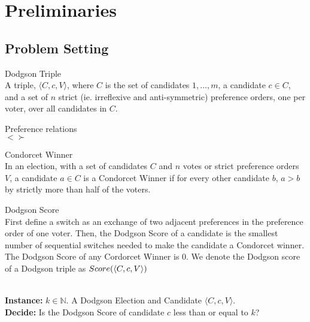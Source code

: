 \section{Preliminaries}

\subsection{Problem Setting}

\begin{defn}{Dodgson Triple}\\
    A triple, $\langle C, c, V \rangle$, where $C$ is the set of candidates
    $1, \dots , m$, a candidate $c \in C$, and a set of $n$ strict
    (ie. irreflexive and anti-symmetric) preference orders,
    one per voter, over all candidates in $C$.
\end{defn}

\begin{defn}{Preference relations} \\
    $< \succ$
\end{defn}

\begin{defn}{Condorcet Winner}\\
    In an election, with a set of candidates $C$ and $n$ votes or strict preference
    orders $V$, a candidate $a \in C$ is a Condorcet Winner if for every other
    candidate $b$, $a > b$ by strictly more than half of the voters.

\end{defn}

\begin{defn}{Dodgson Score}\label{def:dscore}\\
    First define a switch as an exchange of two adjacent preferences in the
    preference order of one voter.
    Then, the Dodgson Score of a candidate is the smallest number of sequential
    switches needed to make the candidate a
    Condorcet winner.
    The Dodgson Score of any Cordorcet Winner is 0.
    We denote the Dodgson score of a Dodgson triple as $Score(\langle C,c,V \rangle)$
\end{defn}

\begin{problem}{} \\
    \tab \textbf{Instance:} $k \in \mathbb{N}$.
        A Dodgson Election and Candidate $\langle C,c,V \rangle$. \\
    \tab \textbf{Decide:} Is the Dodgson Score of candidate $c$ less than or
        equal to $k$?
\end{problem}

